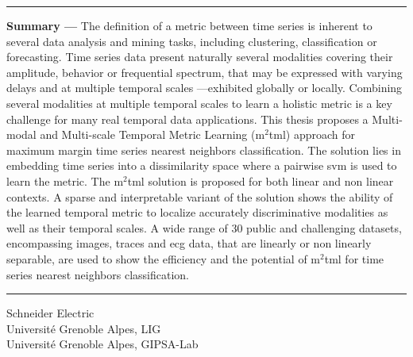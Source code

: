\begin{vcenterpage}
\noindent\rule[2pt]{\textwidth}{0.5pt}
{\large\textbf{Summary ---}}
	The definition of a metric between time series is inherent to several data analysis and mining tasks, including clustering, classification or forecasting. Time series data present naturally several modalities covering their amplitude, behavior or frequential spectrum, that may be expressed with varying delays and at multiple temporal scales —exhibited globally or locally. Combining several modalities at multiple temporal scales to learn a holistic metric is a key challenge for many real temporal data applications. This thesis proposes a Multi-modal and Multi-scale Temporal Metric Learning ({\sc m}$^2${\sc tml}) approach for maximum margin time series nearest neighbors classification. The solution lies in embedding time series into a dissimilarity space where a pairwise {\sc svm} is used to learn the metric. The {\sc m}$^2${\sc tml} solution is proposed for both linear and non linear contexts. A sparse and interpretable variant of the solution shows the ability of the learned temporal metric to localize accurately discriminative modalities as well as their temporal scales. A wide range of 30 public and challenging datasets, encompassing images, traces and {\sc ecg} data, that are linearly or non linearly separable, are used to show the efficiency and the potential of {\sc m}$^2${\sc tml} for time series nearest neighbors classification.
\\
\noindent\rule[2pt]{\textwidth}{0.5pt}
\begin{center}
	Schneider Electric	\\
	Université Grenoble Alpes, LIG\\
	Université Grenoble Alpes, GIPSA-Lab \\
\end{center}
\end{vcenterpage}

